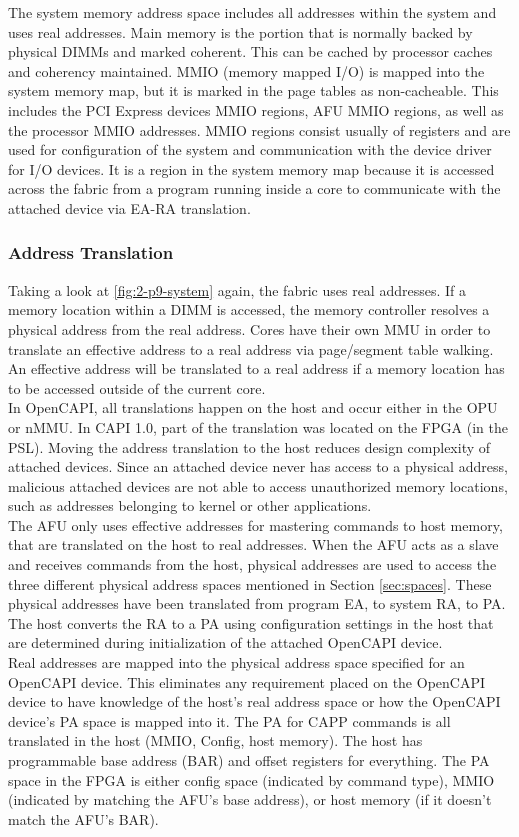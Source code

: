 The system memory address space includes all addresses within the system and uses real addresses. Main memory is the portion that is normally backed by physical DIMMs and marked coherent. This can be cached by processor caches and coherency maintained. MMIO (memory mapped I/O) is mapped into the system memory map, but it is marked in the page tables as non-cacheable. This includes the PCI Express devices MMIO regions, AFU MMIO regions, as well as the processor MMIO addresses. MMIO regions consist usually of registers and are used for configuration of the system and communication with the device driver for I/O devices. It is a region in the system memory map because it is accessed across the fabric from a program running inside a core to communicate with the attached device via EA-RA translation.



\subsubsection{Address Translation}
Taking a look at \autoref{fig:2-p9-system} again, the fabric uses real addresses. If a memory location within a DIMM is accessed, the memory controller resolves a physical address from the real address. Cores have their own MMU in order to translate an effective address to a real address via page/segment table walking. An effective address will be translated to a real address if a memory location has to be accessed outside of the current core.\\
In OpenCAPI, all translations happen on the host and occur either in the OPU or nMMU. In CAPI 1.0, part of the translation was located on the FPGA (in the PSL). Moving the address translation to the host reduces design complexity of attached devices. Since an attached device never has access to a physical address, malicious attached devices are not able to access unauthorized memory locations, such as addresses belonging to kernel or other applications.\\
The AFU only uses effective addresses for mastering commands to host memory, that are translated on the host to real addresses. When the AFU acts as a slave and receives commands from the host, physical addresses are used to access the three different physical address spaces mentioned in Section \ref{sec:spaces}. These physical addresses have been translated from program EA, to system RA, to PA. The host converts the RA to a PA using configuration settings in the host that are determined during initialization of the attached OpenCAPI device.\\
Real addresses are mapped into the physical address space specified for an OpenCAPI device. This eliminates any requirement placed on the OpenCAPI device to have knowledge of the host’s real address space or how the OpenCAPI device’s PA space is mapped into it. The PA for CAPP commands is all translated in the host (MMIO, Config, host memory). The host has programmable base address (BAR) and offset registers for everything. The PA space in the FPGA is either config space (indicated by command type), MMIO (indicated by matching the AFU's base address), or host memory (if it doesn't match the AFU's BAR).

